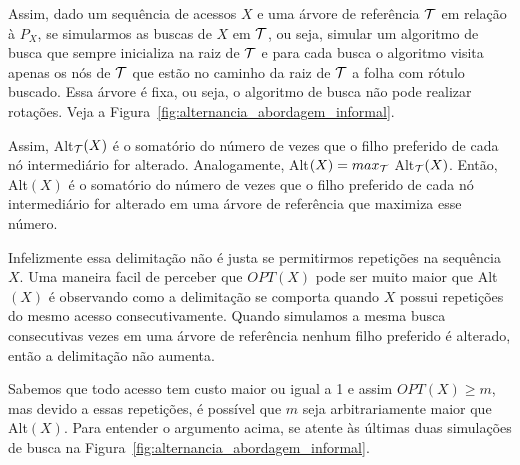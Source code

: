 Assim, dado um sequência de acessos $X$ e uma árvore de referência $\mathcal{T}$ em relação à $P_X$, se simularmos as buscas de $X$ em $\mathcal{T}$, ou seja, simular um algoritmo de busca que sempre inicializa na raiz de $\mathcal{T}$ e para cada busca o algoritmo visita apenas os nós de $\mathcal{T}$ que estão no caminho da raiz de $\mathcal{T}$ a folha com rótulo buscado. Essa árvore é fixa, ou seja, o algoritmo de busca não pode realizar rotações. Veja a Figura~\ref{fig:alternancia_abordagem_informal}.

Assim, Alt$_{\mathcal{T}}(X)$ é o somatório do número de vezes que o filho preferido de cada nó intermediário for alterado. Analogamente, Alt$(X) = max_{\mathcal{T}}$ Alt$_{\mathcal{T}}(X)$. Então, Alt$(X)$ é o somatório do número de vezes que o filho preferido de cada nó intermediário for alterado em uma árvore de referência que maximiza esse número.

Infelizmente essa delimitação não é justa se permitirmos repetições na sequência $X$. Uma maneira facil de perceber que $OPT(X)$ pode ser muito maior que Alt$(X)$ é observando como a delimitação se comporta quando $X$ possui repetições do mesmo acesso consecutivamente. Quando simulamos a mesma busca consecutivas vezes em uma árvore de referência nenhum filho preferido é alterado, então a delimitação não aumenta.

Sabemos que todo acesso tem custo maior ou igual a 1 e assim $OPT(X) \geq m$, mas devido a essas repetições, é possível que $m$ seja arbitrariamente maior que Alt$(X)$. Para entender o argumento acima, se atente às últimas duas simulações de busca na Figura~\ref{fig:alternancia_abordagem_informal}.

